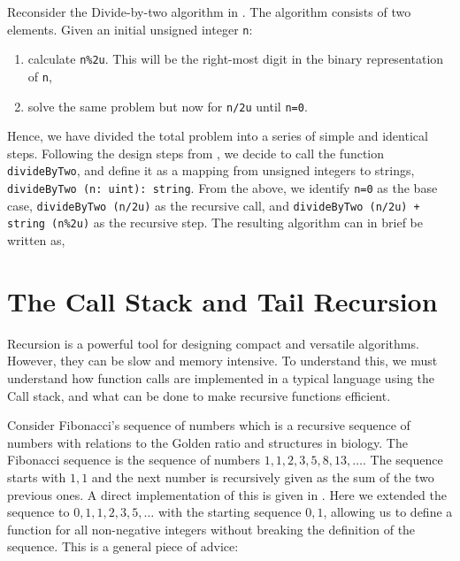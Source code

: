 \documentclass[fsharpNotes.tex]{subfiles}
\begin{document}
Reconsider the Divide-by-two algorithm in . The algorithm consists of two elements. Given an initial unsigned integer \lstinline{n}:
\begin{enumerate}
\item calculate \lstinline{n%2u}. This will be the right-most digit in the binary representation of \lstinline{n},
\item solve the same problem but now for \lstinline{n/2u} until \lstinline{n=0}.
\end{enumerate}
Hence, we have divided the total problem into a series of simple and identical steps. Following the design steps from , we decide to call the function \lstinline{divideByTwo}, and define it as a mapping from unsigned integers to strings, \lstinline{divideByTwo (n: uint): string}. From the above, we identify \lstinline{n=0} as the base case, \lstinline{divideByTwo (n/2u)} as the recursive call, and \lstinline{divideByTwo (n/2u) + string (n%2u)} as the recursive step. The resulting algorithm can in brief be written as, 
%
%

\section{The Call Stack and Tail Recursion}
\label{sec:callStack}
Recursion is a powerful tool for designing compact and versatile algorithms. However, they can be slow and memory intensive. To understand this, we must understand how function calls are implemented in a typical language using the Call stack, and what can be done to make recursive functions efficient.


Consider Fibonacci's sequence of numbers which is a recursive sequence of numbers with relations to the Golden ratio and structures in biology. The Fibonacci sequence is the sequence of numbers $1, 1, 2, 3, 5, 8, 13, \ldots$. The sequence starts with $1, 1$ and the next number is recursively given as the sum of the two previous ones. A direct implementation of this is given in .
%
%
Here we extended the sequence to $0, 1, 1, 2, 3, 5, \ldots$ with the starting sequence $0, 1$, allowing us to define a function for all non-negative integers without breaking the definition of the sequence. This is a general piece of advice:  
\end{document}
